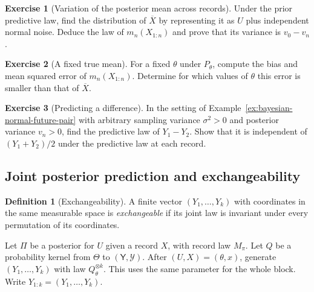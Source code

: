 \documentclass[11pt,oneside]{book}
\theoremstyle{definition}
\newtheorem{definition}[theorem]{Definition}
\newtheorem{exercise}{Exercise}[section]
\theoremstyle{remark}
\begin{document}
\begin{exercise}[Variation of the posterior mean across records]
\label{exer:bayesian-normal-prior-mean-variation}
Under the prior predictive law, find the distribution of
$\overline X$ by representing it as $U$ plus independent
normal noise. Deduce the law of $m_n(X_{1:n})$ and prove that
its variance is $v_0-v_n$.
\end{exercise}

\begin{exercise}[A fixed true mean]
\label{exer:bayesian-normal-fixed-mean-risk}
For a fixed $\theta$ under $P_\theta$, compute the bias and mean
squared error of $m_n(X_{1:n})$. Determine for which values of
$\theta$ this error is smaller than that of $\overline X$.
\end{exercise}

\begin{exercise}[Predicting a difference]
\label{exer:bayesian-normal-future-difference}
In the setting of Example~\ref{ex:bayesian-normal-future-pair}
with arbitrary sampling variance $\sigma^2>0$ and posterior
variance $v_n>0$, find the predictive law of $Y_1-Y_2$.
Show that it is independent of $(Y_1+Y_2)/2$ under the predictive
law at each record.
\end{exercise}

\subsection{Joint posterior prediction and exchangeability}
\label{subsec:bayesian-joint-prediction}

\begin{definition}[Exchangeability]
\label{def:bayesian-finite-exchangeability}
A finite vector $(Y_1,\ldots,Y_k)$ with coordinates in the same
measurable space is \emph{exchangeable} if its joint law is
invariant under every permutation of its coordinates.
\end{definition}

Let $\Pi$ be a posterior for $U$ given a record $X$, with record
law $M_\pi$. Let $Q$ be a probability kernel from $\Theta$ to
$(\mathsf Y,\mathcal Y)$. After $(U,X)=(\theta,x)$, generate
$(Y_1,\ldots,Y_k)$ with law $Q_\theta^{\otimes k}$. This uses the
same parameter for the whole block. Write $Y_{1:k}=(Y_1,\ldots,Y_k)$.
\end{document}
